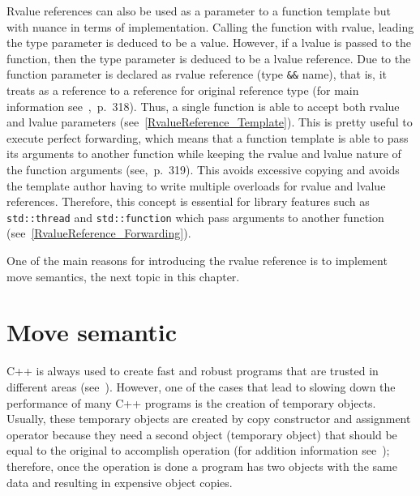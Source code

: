 \documentclass[11pt]{report}
\begin{document}
Rvalue references can also be used as a parameter to a function template but with nuance in terms of implementation. Calling the function with rvalue, leading the type parameter is deduced to be a value. However, if a lvalue is passed to the function, then the type parameter is deduced to be a lvalue reference. Due to the function parameter is declared as rvalue reference (type \texttt{\&\&} name), that is, it treats as a reference to a reference for original reference type (for main information see~\cite{Williams:2012:CCA},~p.~318). Thus, a single function is able to accept both rvalue and lvalue parameters (see~\ref{RvalueReference_Template}). This is pretty useful to execute perfect forwarding, which means that a function template is able to pass its arguments to another function while keeping the rvalue and lvalue nature of the function arguments (see\cite{Williams:2012:CCA},~p.~319). This avoids excessive copying and avoids the template author having to write multiple overloads for rvalue and lvalue references. Therefore, this concept is essential for library features such as \texttt{std::thread} and \texttt{std::function} which pass arguments to another function (see~\ref{RvalueReference_Forwarding}).

One of the main reasons for introducing the rvalue reference is to implement move semantics, the next topic in this chapter.

\section{Move semantic}
\label{section: Move semantic}
C++ is always used to create fast and robust programs that are trusted in different areas (see~\cite{Stroustrup:2012:Cpp11}). However, one of the cases that lead to slowing down the performance of many C++ programs is the creation of temporary objects. Usually, these temporary objects are created by copy constructor and assignment operator because they need a second object (temporary object) that should be equal to the original to accomplish operation (for addition information see~\cite{Stroustrup:2012:Cpp11}); therefore, once the operation is done a program has two objects with the same data and resulting in expensive object copies.
\end{document}
